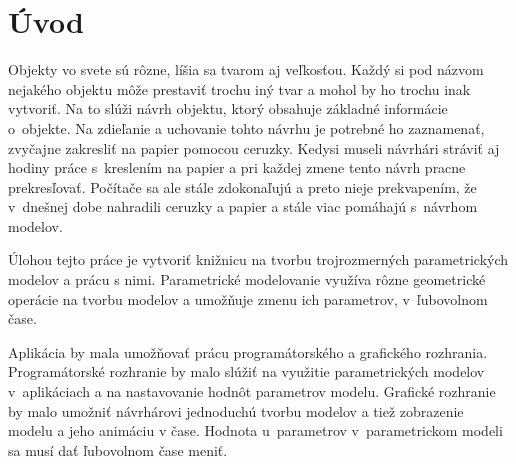 

\chapter{Úvod}

Objekty vo svete sú rôzne, líšia sa tvarom aj veľkosťou. 
Každý si pod názvom nejakého objektu môže prestaviť trochu iný tvar a mohol by ho trochu inak vytvoriť. Na to slúži návrh objektu, ktorý obsahuje základné informácie o~objekte. Na zdieľanie a uchovanie tohto návrhu je potrebné ho zaznamenať, zvyčajne zakresliť  na papier pomocou ceruzky. Kedysi museli návrhári stráviť aj hodiny práce s~kreslením na papier a pri každej zmene tento návrh pracne prekresľovať. 
Počítače sa ale stále zdokonaľujú a preto nieje prekvapením, že v~dnešnej dobe nahradili ceruzky a papier a stále viac pomáhajú s~návrhom modelov.






Úlohou tejto práce je vytvoriť knižnicu na tvorbu trojrozmerných parametrických modelov a prácu s nimi. Parametrické modelovanie využíva rôzne geometrické operácie na tvorbu modelov a umožňuje zmenu ich parametrov, v~ľubovolnom čase. 



Aplikácia by mala umožňovať prácu programátorského a grafického rozhrania. Programátorské rozhranie by malo slúžiť na využitie parametrických modelov v~aplikáciach a na nastavovanie hodnôt parametrov modelu. Grafické rozhranie by malo umožniť návrhárovi jednoduchú tvorbu modelov a tiež zobrazenie modelu a jeho animáciu v čase. Hodnota u~parametrov v~parametrickom modeli sa musí dať ľubovolnom čase meniť.



